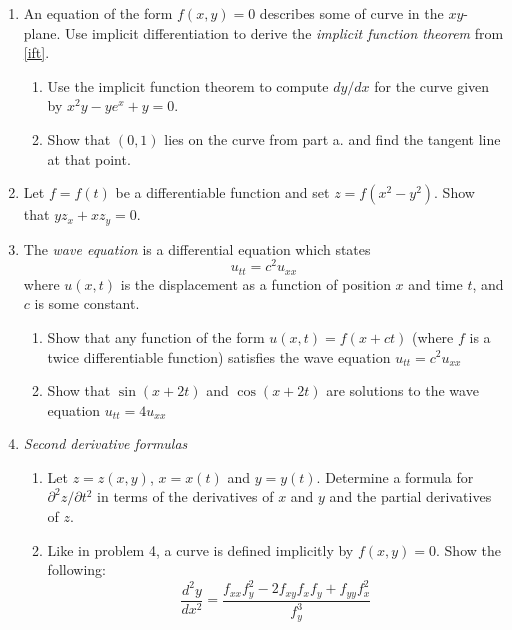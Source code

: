 \documentclass[12pt]{article}
\numberwithin{equation}{subsection}
\numberwithin{figure}{subsection}
\theoremstyle{note}
\begin{document}
{\begin{enumerate}[label=\arabic*.]
\item An equation of the form $f(x,y)=0$ describes some of curve in the $xy$-plane. Use implicit differentiation to derive the \textit{implicit function theorem} from \eqref{ift}.

\begin{enumerate}
\item Use the implicit function theorem to compute $dy/dx$ for the curve given by $x^2y-ye^{x}+y=0$. 
\item Show that $(0,1)$ lies on the curve from part a. and find the tangent line at that point.%
\end{enumerate}

\item Let $f=f(t)$ be a differentiable function and set $z=f(x^2-y^2)$. Show that $y z_x+xz_y=0$.

\item The \textit{wave equation} is a differential equation which states \[ u_{tt}=c^2 u_{xx}\] where $u(x,t)$ is the displacement as a function of position $x$ and time $t$, and $c$ is some constant. 
\begin{enumerate}

\item Show that any function of the form $u(x,t)=f(x+ct)$ (where $f$ is a twice differentiable function) satisfies the wave equation $u_{tt}=c^2 u_{xx}$
\item Show that $\sin(x+2t)$ and $\cos(x+2t)$ are solutions to the wave equation $u_{tt}=4u_{xx}$
	
\end{enumerate}

\item \textit{Second derivative formulas}

\begin{enumerate}

\item Let $z=z(x,y)$, $x=x(t)$ and $y=y(t)$. Determine a formula for $\partial^2 z/\partial t^2$ in terms of the derivatives of $x$ and $y$ and the partial derivatives of $z$. 

\item Like in problem 4, a curve is defined implicitly by $f(x,y)=0$. Show the following: \begin{equation} \dfrac{d^2y}{dx^2}=\dfrac{ f_{xx} f_y^2-2f_{xy}f_xf_y+f_{yy}f_{x}^2}{f_y^3}\end{equation}

\end{enumerate}


\end{enumerate}}
\end{document}
